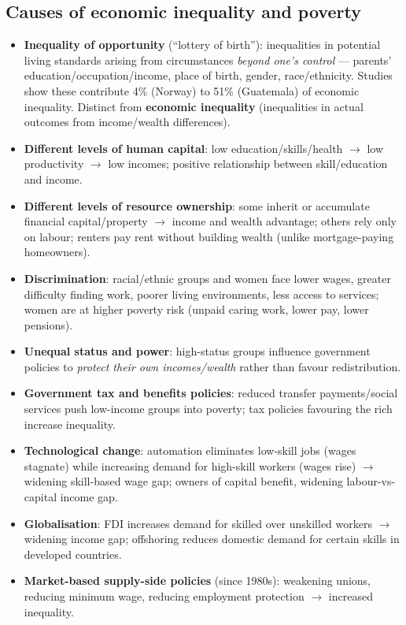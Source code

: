 \documentclass[a4paper,12pt]{article}
\begin{document}
\subsection{Causes of economic inequality and poverty}
\begin{itemize}
  \item \textbf{Inequality of opportunity} (``lottery of birth''): inequalities in potential living standards arising from circumstances \textit{beyond one's control} --- parents' education/occupation/income, place of birth, gender, race/ethnicity. Studies show these contribute 4\% (Norway) to 51\% (Guatemala) of economic inequality. Distinct from \textbf{economic inequality} (inequalities in actual outcomes from income/wealth differences).
  \item \textbf{Different levels of human capital}: low education/skills/health $\to$ low productivity $\to$ low incomes; positive relationship between skill/education and income.
  \item \textbf{Different levels of resource ownership}: some inherit or accumulate financial capital/property $\to$ income and wealth advantage; others rely only on labour; renters pay rent without building wealth (unlike mortgage-paying homeowners).
  \item \textbf{Discrimination}: racial/ethnic groups and women face lower wages, greater difficulty finding work, poorer living environments, less access to services; women are at higher poverty risk (unpaid caring work, lower pay, lower pensions).
  \item \textbf{Unequal status and power}: high-status groups influence government policies to \textit{protect their own incomes/wealth} rather than favour redistribution.
  \item \textbf{Government tax and benefits policies}: reduced transfer payments/social services push low-income groups into poverty; tax policies favouring the rich increase inequality.
  \item \textbf{Technological change}: automation eliminates low-skill jobs (wages stagnate) while increasing demand for high-skill workers (wages rise) $\to$ widening skill-based wage gap; owners of capital benefit, widening labour-vs-capital income gap.
  \item \textbf{Globalisation}: FDI increases demand for skilled over unskilled workers $\to$ widening income gap; offshoring reduces domestic demand for certain skills in developed countries.
  \item \textbf{Market-based supply-side policies} (since 1980s): weakening unions, reducing minimum wage, reducing employment protection $\to$ increased inequality.

\end{itemize}
\end{document}
